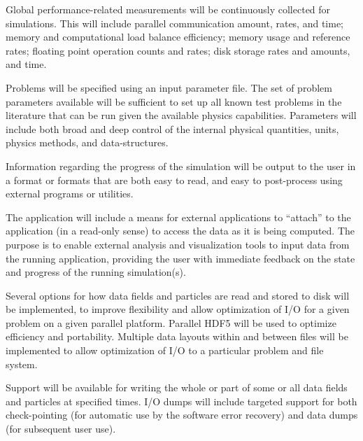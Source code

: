 \documentclass{book}
\begin{document}

   Global performance-related measurements will be continuously
   collected for simulations.  This will include parallel
   communication amount, rates, and time; memory and computational
   load balance efficiency; memory usage and reference rates;
   floating point operation counts and rates; disk storage rates and amounts,
   and time.


   Problems will be specified using an input parameter file.  The set
   of problem parameters available will be sufficient to set up all
   known test problems in the literature that can be run given the
   available physics capabilities.  Parameters will include both broad
   and deep control of the internal physical quantities, units,
   physics methods, and data-structures.

   Information regarding the progress of the simulation will be 
   output to the user in a format or formats that are both easy
   to read, and easy to post-process using external programs or
   utilities.
   
   The application will include a means for external applications to
   ``attach'' to the application (in a read-only sense) to access
   the data as it is being computed.  The purpose is to enable 
   external analysis and visualization tools to input data from the
   running application, providing the user with immediate
   feedback on the state and progress of the running simulation(s).


   Several options for how data fields and particles are read and
   stored to disk will be implemented, to improve flexibility and
   allow optimization of I/O for a given problem on a given parallel
   platform.  Parallel HDF5 will be used to optimize efficiency and
   portability.  Multiple data layouts within and between files will
   be implemented to allow optimization of I/O to a particular problem
   and file system.


   Support will be available for writing the whole or part of some or
   all data fields and particles at specified times.  I/O dumps will
   include targeted support for both check-pointing (for automatic use
   by the software error recovery) and data dumps (for subsequent user
   use).  
   
\end{document}
